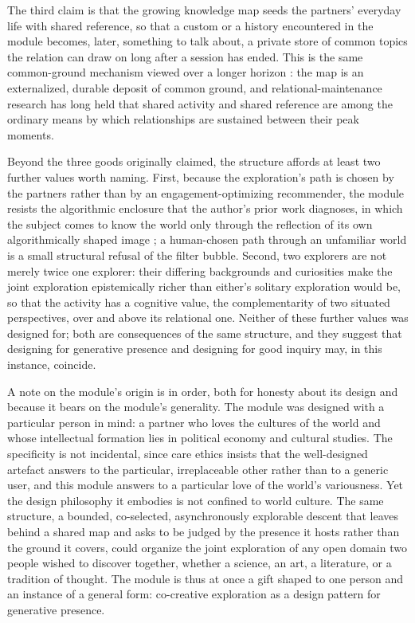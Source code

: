 The third claim is that the growing knowledge map seeds the partners' everyday life with shared reference, so that a custom or a history encountered in the module becomes, later, something to talk about, a private store of common topics the relation can draw on long after a session has ended. This is the same common-ground mechanism viewed over a longer horizon \parencite{clark1996using}: the map is an externalized, durable deposit of common ground, and relational-maintenance research has long held that shared activity and shared reference are among the ordinary means by which relationships are sustained between their peak moments.

Beyond the three goods originally claimed, the structure affords at least two further values worth naming. First, because the exploration's path is chosen by the partners rather than by an engagement-optimizing recommender, the module resists the algorithmic enclosure that the author's prior work diagnoses, in which the subject comes to know the world only through the reflection of its own algorithmically shaped image \parencite{huang2025relational}; a human-chosen path through an unfamiliar world is a small structural refusal of the filter bubble. Second, two explorers are not merely twice one explorer: their differing backgrounds and curiosities make the joint exploration epistemically richer than either's solitary exploration would be, so that the activity has a cognitive value, the complementarity of two situated perspectives, over and above its relational one. Neither of these further values was designed for; both are consequences of the same structure, and they suggest that designing for generative presence and designing for good inquiry may, in this instance, coincide.

A note on the module's origin is in order, both for honesty about its design and because it bears on the module's generality. The module was designed with a particular person in mind: a partner who loves the cultures of the world and whose intellectual formation lies in political economy and cultural studies. The specificity is not incidental, since care ethics insists that the well-designed artefact answers to the particular, irreplaceable other rather than to a generic user, and this module answers to a particular love of the world's variousness. Yet the design philosophy it embodies is not confined to world culture. The same structure, a bounded, co-selected, asynchronously explorable descent that leaves behind a shared map and asks to be judged by the presence it hosts rather than the ground it covers, could organize the joint exploration of any open domain two people wished to discover together, whether a science, an art, a literature, or a tradition of thought. The module is thus at once a gift shaped to one person and an instance of a general form: co-creative exploration as a design pattern for generative presence.

